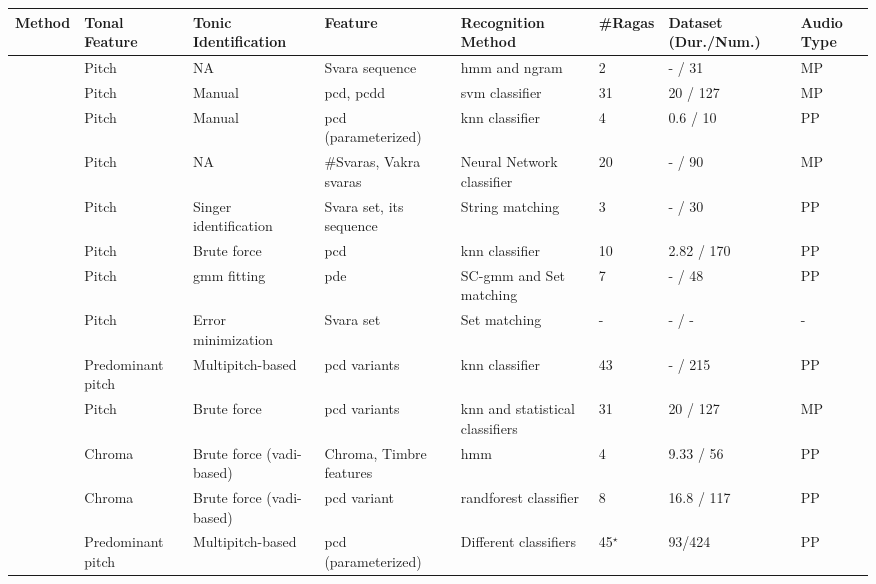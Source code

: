 \begin{table}
	\begin{threeparttable} 
	\scriptsize
		\begin{centering}
			\begin{tabular}{l P{4cm} P{2cm} P{2.5cm} P{2.5cm} L{1cm} P{1.5cm} P{.75cm}}
				\hline 
				Method & \textbf{Tonal Feature} & \textbf{Tonic Identification } & \textbf{Feature} & \textbf{Recognition Method} & \textbf{\#Ragas} & \textbf{Dataset (Dur./Num.)} & \textbf{Audio Type}\tabularnewline
				\hline 
				\cite{pandey2003tansen} & Pitch \citep{BoersmaPaul2001} & NA & Svara sequence & \acrshort{hmm} and \acrshort{ngram} & 2 & - / 31 & MP\tabularnewline
				\cite{chordia2007raag} & Pitch \citep{sun2000pitch} & Manual & \acrshort{pcd}, \acrshort{pcdd} & \acrshort{svm} classifier & 31 & 20 / 127 & MP\tabularnewline
				\cite{belle2009raga} & Pitch \citep{rao2009improving} & Manual & \acrshort{pcd} (parameterized) & \acrshort{knn} classifier & 4 & 0.6 / 10 & PP\tabularnewline
				\cite{Shetty2009} & Pitch \citep{sridhar_2006_svara} & NA & \#Svaras, Vakra svaras & Neural Network classifier & 20 & - / 90 & MP\tabularnewline
				\cite{sridhar2009raga} & Pitch \citep{lee2006automatic} & Singer identification & Svara set, its sequence & String matching & 3 & - / 30 & PP\tabularnewline
				\cite{koduri2011survey} & Pitch \citep{rao2010vocal} & Brute force & \acrshort{pcd} & \acrshort{knn} classifier & 10 & 2.82 / 170 & PP\tabularnewline
				\cite{ranjani2011carnatic} & Pitch \citep{BoersmaPaul2001} & \acrshort{gmm} fitting & \acrshort{pde} & SC-\acrshort{gmm} and Set matching & 7 & - / 48 & PP\tabularnewline
				\cite{chakraborty2012object} & Pitch \citep{sengupta1990study} & Error minimization & Svara set & Set matching & - & - / - & -\tabularnewline
				\cite{koduri2012raga} & Predominant pitch \citep{Salamon2012} & Multipitch-based & \acrshort{pcd} variants & \acrshort{knn} classifier & 43 & - / 215 & PP\tabularnewline
				\cite{chordia2013joint} & Pitch \citep{camacho2007swipe} & Brute force & \acrshort{pcd} variants & \acrshort{knn} and statistical classifiers & 31 & 20 / 127 & MP\tabularnewline
				\cite{dighe2013scale} & Chroma \citep{lartillot2008matlab} & Brute force (\gls{vadi}-based) & Chroma, Timbre features & \acrshort{hmm}  & 4 & 9.33 / 56 & PP\tabularnewline
				\cite{dighe2013swara} & Chroma \citep{lartillot2008matlab} & Brute force (\gls{vadi}-based) & \acrshort{pcd} variant & \acrshort{randforest} classifier & 8 & 16.8 / 117 & PP\tabularnewline
				\cite{koduri2014intonation} & Predominant pitch \citep{Salamon2012} & Multipitch-based & \acrshort{pcd} (parameterized)  & Different classifiers & 45{$^\star$} & 93/424 & PP\tabularnewline

\end{tabular}
\end{centering}
\end{threeparttable}
\end{table}
